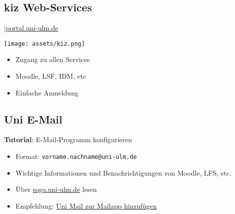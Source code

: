 \documentclass[
	aspectratio=169, 
	10pt 
]{beamer}
\begin{document}
\subsection{kiz Web-Services}
\begin{frame}{\insertsubsection \space|\space\underline{\href{https://portal.uni-ulm.de}{portal.uni-ulm.de}}}
    \begin{fancycolumns}[widths={60}]
        \texttt{[image: assets/kiz.png]}
        \nextcolumn
        \begin{itemize}
            \item Zugang zu allen Services
            \item Moodle, LSF, IDM, etc
            \item Einfache Anmeldung 
        \end{itemize}
    \end{fancycolumns}
\end{frame}

\subsection{Uni E-Mail}
\begin{frame}{\insertsubsection}
    \begin{fancycolumns}[T, widths={30}]
        \begin{center}
            \textbf{Tutorial}: E-Mail-Programm konfigurieren
        \end{center}    
        \nextcolumn
        \begin{itemize}
            \item Format: \lstinline|vorname.nachname@uni-ulm.de|
            \item Wichtige Informationen und Benachrichtigungen von Moodle, LFS, etc.
            \item Über \underline{\href{https://sogo.uni-ulm.de}{sogo.uni-ulm.de}} lesen
            \item Empfehlung: \underline{\href{https://www.uni-ulm.de/einrichtungen/kiz/service-katalog/e-mail-kalender-zusammenarbeit/e-mail/e-mail-programme-konfigurieren/}{Uni Mail zur Mailapp hinzufügen}}
        \end{itemize}
    \end{fancycolumns}
\end{frame}
\end{document}
